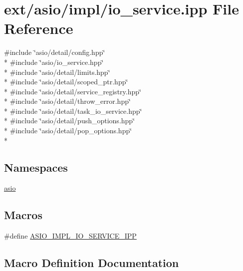 \hypertarget{io__service_8ipp}{}\section{ext/asio/impl/io\+\_\+service.ipp File Reference}
\label{io__service_8ipp}
{\ttfamily \#include \char`\"{}asio/detail/config.\+hpp\char`\"{}}\\*
{\ttfamily \#include \char`\"{}asio/io\+\_\+service.\+hpp\char`\"{}}\\*
{\ttfamily \#include \char`\"{}asio/detail/limits.\+hpp\char`\"{}}\\*
{\ttfamily \#include \char`\"{}asio/detail/scoped\+\_\+ptr.\+hpp\char`\"{}}\\*
{\ttfamily \#include \char`\"{}asio/detail/service\+\_\+registry.\+hpp\char`\"{}}\\*
{\ttfamily \#include \char`\"{}asio/detail/throw\+\_\+error.\+hpp\char`\"{}}\\*
{\ttfamily \#include \char`\"{}asio/detail/task\+\_\+io\+\_\+service.\+hpp\char`\"{}}\\*
{\ttfamily \#include \char`\"{}asio/detail/push\+\_\+options.\+hpp\char`\"{}}\\*
{\ttfamily \#include \char`\"{}asio/detail/pop\+\_\+options.\+hpp\char`\"{}}\\*
\subsection*{Namespaces}
\begin{DoxyCompactItemize}
\item 
 \hyperlink{namespaceasio}{asio}
\end{DoxyCompactItemize}
\subsection*{Macros}
\begin{DoxyCompactItemize}
\item 
\#define \hyperlink{io__service_8ipp_ad354d8b7eebfc271a94e77ede773aff2}{A\+S\+I\+O\+\_\+\+I\+M\+P\+L\+\_\+\+I\+O\+\_\+\+S\+E\+R\+V\+I\+C\+E\+\_\+\+I\+P\+P}
\end{DoxyCompactItemize}


\subsection{Macro Definition Documentation}
\hypertarget{io__service_8ipp_ad354d8b7eebfc271a94e77ede773aff2}{}
